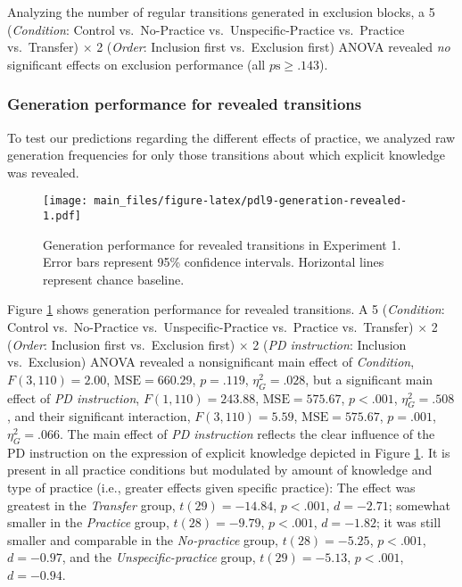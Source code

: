 \documentclass[jou]{apa6}
\theoremstyle{definition}
\theoremstyle{definition}
\theoremstyle{definition}
\theoremstyle{remark}
\begin{document}
Analyzing the number of regular transitions generated in exclusion
blocks, a 5 (\emph{Condition}: Control vs.~No-Practice
vs.~Unspecific-Practice vs.~Practice vs.~Transfer) \(\times\) 2
(\emph{Order}: Inclusion first vs.~Exclusion first) ANOVA revealed
\emph{no} significant effects on exclusion performance (all
\(p\mathrm{s} \geq .143\)).

\subsubsection{Generation performance for revealed
transitions}\label{generation-performance-for-revealed-transitions}

To test our predictions regarding the different effects of practice, we
analyzed raw generation frequencies for only those transitions about
which explicit knowledge was revealed.

\begin{figure}[htbp]
\centering
\texttt{[image: main\_files/figure-latex/pdl9-generation-revealed-1.pdf]}
\caption{\label{fig:pdl9-generation-revealed}Generation performance for
revealed transitions in Experiment 1. Error bars represent 95\%
confidence intervals. Horizontal lines represent chance baseline.}
\end{figure}

Figure \ref{fig:pdl9-generation-revealed} shows generation performance
for revealed transitions. A 5 (\emph{Condition}: Control vs.~No-Practice
vs.~Unspecific-Practice vs.~Practice vs.~Transfer) \(\times\) 2
(\emph{Order}: Inclusion first vs.~Exclusion first) \(\times\) 2
(\emph{PD instruction}: Inclusion vs.~Exclusion) ANOVA revealed a
nonsignificant main effect of \emph{Condition}, \(F(3, 110) = 2.00\),
\(\mathrm{MSE} = 660.29\), \(p = .119\), \(\eta^2_G = .028\), but a
significant main effect of \emph{PD instruction},
\(F(1, 110) = 243.88\), \(\mathrm{MSE} = 575.67\), \(p < .001\),
\(\eta^2_G = .508\), and their significant interaction,
\(F(3, 110) = 5.59\), \(\mathrm{MSE} = 575.67\), \(p = .001\),
\(\eta^2_G = .066\). The main effect of \emph{PD instruction} reflects
the clear influence of the PD instruction on the expression of explicit
knowledge depicted in Figure \ref{fig:pdl9-generation-revealed}. It is
present in all practice conditions but modulated by amount of knowledge
and type of practice (i.e., greater effects given specific practice):
The effect was greatest in the \emph{Transfer} group,
\(t(29) = -14.84\), \(p < .001\), \(d = -2.71\); somewhat smaller in the
\emph{Practice} group, \(t(28) = -9.79\), \(p < .001\), \(d = -1.82\);
it was still smaller and comparable in the \emph{No-practice} group,
\(t(28) = -5.25\), \(p < .001\), \(d = -0.97\), and the
\emph{Unspecific-practice} group, \(t(29) = -5.13\), \(p < .001\),
\(d = -0.94\).
\end{document}
